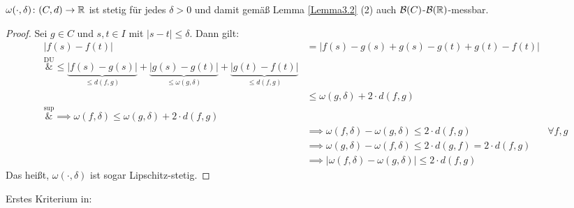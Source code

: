 \begin{lemma}\label{lemma7.8}
$\omega(\cdot,\delta)\colon (C,d)\to\mathbb{R}$ ist stetig für jedes $\delta>0$ und damit gemäß Lemma \ref{Lemma3.2} (2) auch $\mathcal{B}(C)$-$\mathcal{B}(\mathbb{R})$-messbar.
\end{lemma}
\begin{proof}
Sei $g\in C$  und $s,t\in I$ mit $|s-t|\leq\delta$. Dann gilt:
\begin{align*}
\big| f(s)-f(t)\big|
&=\big|f(s)-g(s)+g(s)-g(t)+g(t)-f(t)\big|\\
\overset{\text{DU}}&{\leq}
\underbrace{\big|f(s)-g(s)\big|}_{\leq d(f,g)}+\underbrace{\big| g(s)-g(t)\big|}_{\leq\omega(g,\delta)}+\underbrace{\big| g(t)-f(t)\big|}_{\leq d(f,g)}\\
&\leq
\omega(g,\delta)+2\cdot d(f,g)\\
\overset{\sup}&{\implies}
\omega(f,\delta)
\leq\omega(g,\delta)+2\cdot d(f,g)\\
&\implies \omega(f,\delta)-\omega(g,\delta)
\leq 2\cdot d(f,g) &\forall f,g\\
&\implies \omega(g,\delta)-\omega(f,\delta)
\leq 2\cdot d(g,f)=2\cdot d(f,g)\\
&\implies
\big|\omega(f,\delta)-\omega(g,\delta)\big|\leq 2\cdot d(f,g)
\end{align*}
Das heißt, $\omega(\cdot,\delta)$ ist sogar Lipschitz-stetig.
\end{proof}



Erstes Kriterium in:

